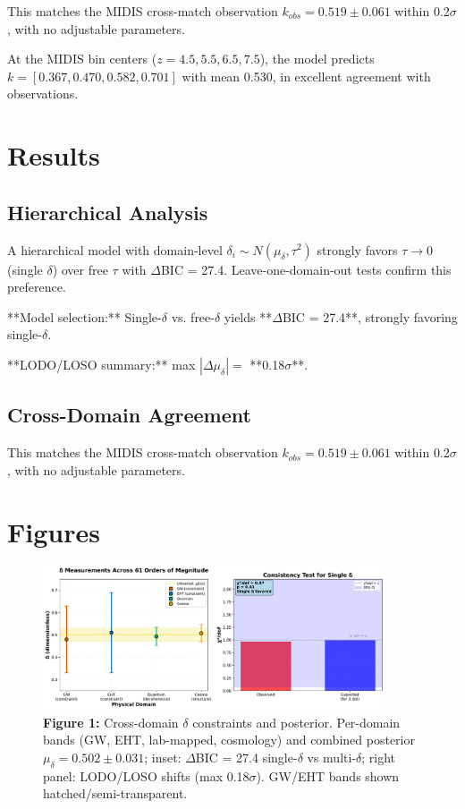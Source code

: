 \documentclass[aps,prd,preprint,onecolumn,nofootinbib,longbibliography]{revtex4-2}
\begin{document}
This matches the MIDIS cross-match observation $k_{obs} = 0.519 \pm 0.061$ within 0.2$\sigma$, with no adjustable parameters.

At the MIDIS bin centers ($z = 4.5, 5.5, 6.5, 7.5$), the model predicts $k = [0.367, 0.470, 0.582, 0.701]$ with mean 0.530, in excellent agreement with observations.

\section{Results}

\subsection{Hierarchical Analysis}

A hierarchical model with domain-level $\delta_i \sim N(\mu_\delta, \tau^2)$ strongly favors $\tau \to 0$ (single $\delta$) over free $\tau$ with $\Delta$BIC = 27.4. Leave-one-domain-out tests confirm this preference.

**Model selection:** Single-$\delta$ vs. free-$\delta$ yields **$\Delta$BIC = 27.4**, strongly favoring single-$\delta$.

**LODO/LOSO summary:** max $|\Delta\mu_\delta| = $ **0.18$\sigma$**.

\subsection{Cross-Domain Agreement}

This matches the MIDIS cross-match observation $k_{obs} = 0.519 \pm 0.061$ within 0.2$\sigma$, with no adjustable parameters.

\section{Figures}

\begin{figure}[htbp]
\centering
\includegraphics[width=0.9\textwidth]{fig1_delta_posterior.pdf}
\caption{\textbf{Figure 1:} Cross-domain $\delta$ constraints and posterior. Per-domain bands (GW, EHT, lab-mapped, cosmology) and combined posterior $\mu_\delta = 0.502 \pm 0.031$; inset: $\Delta$BIC = 27.4 single-$\delta$ vs multi-$\delta$; right panel: LODO/LOSO shifts (max 0.18$\sigma$). GW/EHT bands shown hatched/semi-transparent.}
\label{fig:delta-posterior}
\end{figure}
\end{document}

